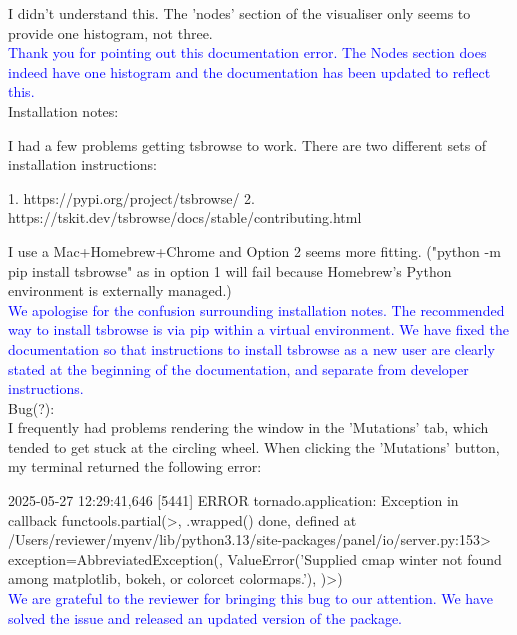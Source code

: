 \documentclass{article}
\begin{document}
I didn't understand this. The 'nodes' section of the visualiser only seems to provide one histogram, 
not three.\\
\textcolor{blue}{Thank you for pointing out this documentation error. The Nodes section 
does indeed have one histogram and the documentation has been updated to reflect this.}\\

Installation notes:

I had a few problems getting tsbrowse to work. There are two different sets of installation instructions:

1. https://pypi.org/project/tsbrowse/
2. https://tskit.dev/tsbrowse/docs/stable/contributing.html

I use a Mac+Homebrew+Chrome and Option 2 seems more fitting. ("python -m pip install tsbrowse" as in 
option 1 will fail because Homebrew's Python environment is externally managed.)\\
\textcolor{blue}{We apologise for the confusion surrounding installation notes. The recommended way to install 
tsbrowse is via pip within a virtual environment. We have fixed the documentation so that instructions 
to install tsbrowse as a new user are clearly stated at the beginning of the documentation,
and separate from developer instructions.}\\

Bug(?):\\

I frequently had problems rendering the window in the 'Mutations' tab, which tended to get stuck at the 
circling wheel. When clicking the 'Mutations' button, my terminal returned the following error:

2025-05-27 12:29:41,646 [5441] ERROR    tornado.application: Exception in callback functools.partial(>, .wrapped() 
done, defined at \\
/Users/reviewer/myenv/lib/python3.13/site-packages/panel/io/server.py:153> 
exception=AbbreviatedException(, ValueError('Supplied cmap winter not found among matplotlib, bokeh, or colorcet 
colormaps.'), )>)\\
\textcolor{blue}{We are grateful to the reviewer for bringing this bug to our attention. 
We have solved the issue and released an updated version of the package.}\\
\end{document}
